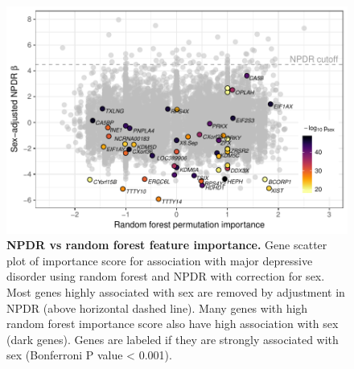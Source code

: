 \documentclass{article}
\begin{document}


\begin{figure}[!tpb]%
\centerline{\includegraphics[]{../figs/mostafavi_npdr_rf_mdd.pdf}}
\caption{{\bf NPDR vs random forest feature importance.}
Gene scatter plot of importance score for association with major depressive disorder using random forest and NPDR with correction for sex. Most genes highly associated with sex are removed by adjustment in NPDR (above horizontal dashed line). Many genes with high random forest importance score also have high association with sex (dark genes). Genes are labeled if they are strongly associated with sex (Bonferroni P value < 0.001).}
\label{fig:mostafavi_npdr_rf_mdd}
\end{figure}
\end{document}
